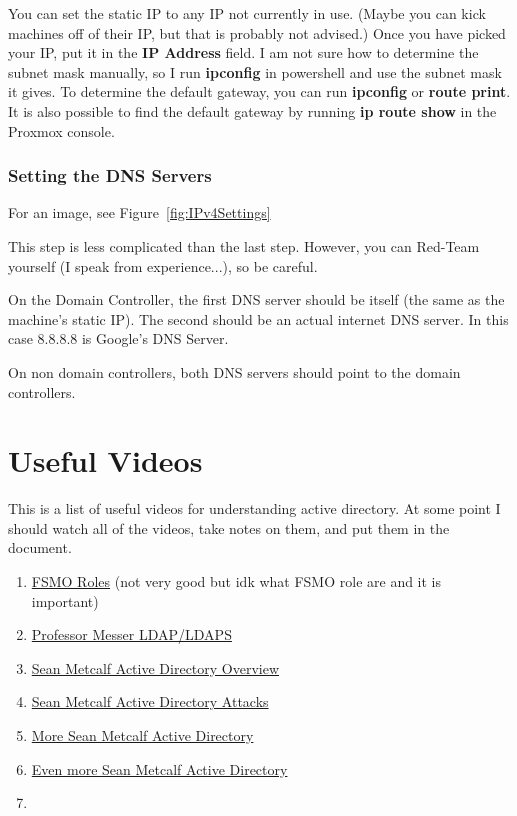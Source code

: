 \documentclass{article}
\begin{document}
You can set the static IP to any IP not currently in use.
(Maybe you can kick machines off of their IP, but that is probably not advised.)
Once you have picked your IP, put it in the \textbf{IP Address} field.
I am not sure how to determine the subnet mask manually, so I run \textbf{ipconfig} in powershell
and use the subnet mask it gives.
To determine the default gateway, you can run \textbf{ipconfig} or \textbf{route print}.
It is also possible to find the default gateway by running \textbf{ip route show} in the Proxmox console. 


\subsubsection{Setting the DNS Servers}
For an image, see Figure~\ref{fig:IPv4Settings}

This step is less complicated than the last step. However, you can Red-Team yourself (I speak from experience...), so be careful.

On the Domain Controller, the first DNS server should be itself (the same as the machine's static IP). The second should be an actual internet DNS server.
In this case 8.8.8.8 is Google's DNS Server.

On non domain controllers, both DNS servers should point to the domain controllers.

\section{Useful Videos}
This is a list of useful videos for understanding active directory.
At some point I should watch all of the videos, take notes on them, and put them in the document.
\begin{enumerate}
        \item \href{https://youtu.be/n5suPvKqo_Y}{FSMO Roles} (not very good but idk what FSMO role are and it is important)
        \item \href{https://youtu.be/5rEA7vRV3VE}{Professor Messer LDAP/LDAPS}
        \item \href{https://youtu.be/2w1cesS7pGY}{Sean Metcalf Active Directory Overview}
        \item \href{https://youtu.be/ze1UcSLOypw}{Sean Metcalf Active Directory Attacks}
        \item \href{https://youtu.be/Lz6haohGAMc}{More Sean Metcalf Active Directory}
        \item\href{https://youtu.be/b6GUXerE9Ac}{Even more Sean Metcalf Active Directory}
        \item 
\end{enumerate}
\end{document}
